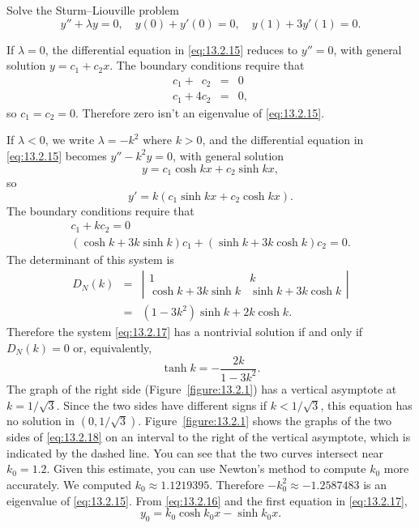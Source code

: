 \begin{example}
  \label{example:13.2.5} \rm Solve the Sturm--Liouville problem
  \begin{equation}
    \label{eq:13.2.15}y''+\lambda y=0,\quad y(0)+y'(0)=0,\quad y(1)+3y'(1)=0.
  \end{equation}
\end{example}

\begin{examplesolution}
\solution If $\lambda=0$, the differential equation in \eqref{eq:13.2.15} reduces to $y''=0$, with
general solution $y=c_{1}+c_{2}x$. The boundary conditions require that
\begin{eqnarray*}
  c_{1}+\phantom{4}c_{2} & = & 0 \\
  c_{1}+4c_{2}           & = & 0,
\end{eqnarray*}
so $c_{1}=c_{2}=0$. Therefore zero isn't an eigenvalue of \eqref{eq:13.2.15}.

If $\lambda<0$, we write $\lambda=-k^{2}$ where $k>0$, and the differential equation in
\eqref{eq:13.2.15} becomes $y''-k^{2}y=0$, with general solution
\begin{equation}
  \label{eq:13.2.16}y=c_{1}\cosh kx+c_{2}\sinh kx,
\end{equation}
so
\[
  y'=k(c_{1}\sinh kx+c_{2}\cosh kx).
\]
The boundary conditions require that
\begin{equation}
  \label{eq:13.2.17}
  \begin{gathered}
    c_{1}+kc_{2}=0\\ (\cosh k+3k\sinh k)c_{1}+(\sinh k+3k\cosh k)c_{2}=0.
  \end{gathered}
\end{equation}
The determinant of this system is
\begin{eqnarray*}
  D_{N}(k)&=& \left|
  \begin{array}{cccccc}
    1                 & k                 \\
    \cosh k+3k\sinh k & \sinh k+3k\cosh k
  \end{array}\right|\\ &=&(1-3k^{2})\sinh k+2k\cosh k.
\end{eqnarray*}
Therefore the system \eqref{eq:13.2.17} has a nontrivial solution if and only if $D_{N}(k)=0$ or,
equivalently,
\begin{equation}
  \label{eq:13.2.18}\tanh k=-\frac{2k}{1-3k^{2}}.
\end{equation}
The graph of the right side (Figure~\ref{figure:13.2.1}) has a vertical asymptote at $k=1/\sqrt{3}$.
Since the two sides have different signs if $k<1/\sqrt{3}$, this equation has no solution in
$(0,1/\sqrt{3})$. Figure~\ref{figure:13.2.1} shows the graphs of the two sides of \eqref{eq:13.2.18}
on an interval to the right of the vertical asymptote, which is indicated by the dashed line. You
can see that the two curves intersect near $k_{0}=1.2$. Given this estimate, you can use Newton's method to
compute $k_{0}$ more accurately. We computed $k_{0}\approx 1.1219395$. Therefore
$-k_{0}^{2}\approx-1.2587483$ is an eigenvalue of \eqref{eq:13.2.15}. From \eqref{eq:13.2.16} and
the first equation in \eqref{eq:13.2.17},
\[
  y_{0}=k_{0}\cosh k_{0}x-\sinh k_{0}x.
\]


\end{examplesolution}
